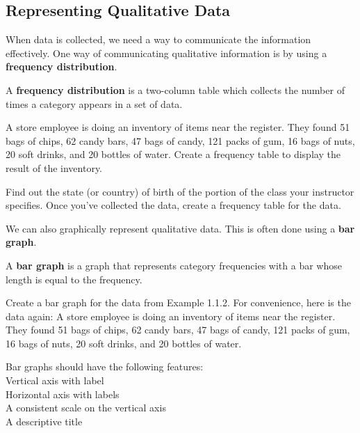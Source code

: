 \documentclass[notes]{subfiles}
\begin{document}
	\subsection*{Representing Qualitative Data}
		When data is collected, we need a way to communicate the information effectively.  One way of communicating qualitative information is by using a \textbf{frequency distribution}.

		\begin{defn}
			A \textbf{frequency distribution} is a two-column table which collects the number of times a category appears in a set of data.
		\end{defn}

		\begin{ex}
			A store employee is doing an inventory of items near the register.  They found 51 bags of chips, 62 candy bars, 47 bags of candy, 121 packs of gum, 16 bags of nuts, 20 soft drinks, and 20 bottles of water.  Create a frequency table to display the result of the inventory.
		\end{ex}
			\newpage

		\begin{ex}
			Find out the state (or country) of birth of the portion of the class your instructor specifies.  Once you've collected the data, create a frequency table for the data.
		\end{ex}

		We can also graphically represent qualitative data.  This is often done using a \textbf{bar graph}.
		
		\begin{defn}
			A \textbf{bar graph} is a graph that represents category frequencies with a bar whose length is equal to the frequency.
		\end{defn}

		\begin{ex}
			Create a bar graph for the data from Example 1.1.2.  For convenience, here is the data again: A store employee is doing an inventory of items near the register.  They found 51 bags of chips, 62 candy bars, 47 bags of candy, 121 packs of gum, 16 bags of nuts, 20 soft drinks, and 20 bottles of water.
		\end{ex}
			\newpage

		\begin{rmk}
			Bar graphs should have the following features:\\[15pt]
			\tabitem Vertical axis with label\\[15pt]
			\tabitem Horizontal axis with labels\\[15pt]
			\tabitem A consistent scale on the vertical axis \\[15pt]
			\tabitem A descriptive title			
		\end{rmk}
\end{document}
